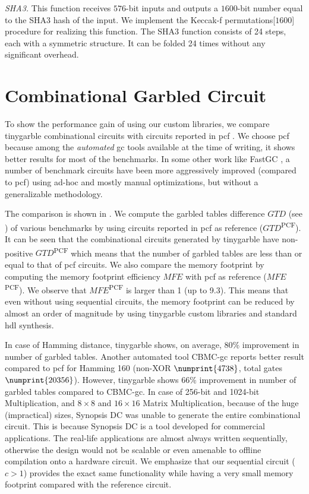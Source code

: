 \textit{SHA3.} This function receives $576$-bit inputs and outputs a $1600$-bit number equal to the SHA3 hash of the input.
We implement the Keccak-f permutations[$1600$] procedure for realizing this function.
The SHA3 function consists of 24 steps, each with a symmetric structure.
It can be folded 24 times without any significant overhead.

\section{Combinational Garbled Circuit}
To show the performance gain of using our custom libraries, we compare \gls{tinygarble} combinational circuits with circuits reported in \gls{pcf} \cite{kreuter2013pcf}.
We choose \gls{pcf} because among the \emph{automated} \acrshort{gc} tools available at the time of writing, it shows better results for most of the benchmarks.
In some other work like FastGC \cite{huang2011faster}, a number of benchmark circuits have been more aggressively improved (compared to \gls{pcf}) using ad-hoc and mostly manual optimizations, but without a generalizable methodology.

The comparison is shown in .
We compute the garbled tables difference $\mathit{GTD}$ (see ) of various benchmarks by using circuits reported in \gls{pcf} as reference ($\mathit{GTD}$\textsuperscript{PCF}).
It can be seen that the combinational circuits generated by \gls{tinygarble} have non-positive $\mathit{GTD}$\textsuperscript{PCF} which means that the number of garbled tables are less than or equal to that of \gls{pcf} circuits.
We also compare the memory footprint by computing the memory footprint efficiency $\mathit{MFE}$ with \gls{pcf} as reference ($\mathit{MFE}$\textsuperscript{PCF}).
We observe that $\mathit{MFE}$\textsuperscript{PCF} is larger than 1 (up to 9.3).
This means that even without using sequential circuits, the memory footprint can be reduced by almost an order of magnitude by using \gls{tinygarble} custom libraries and standard \acrshort{hdl} synthesis.

In case of Hamming distance, \gls{tinygarble} shows, on average, $80\%$ improvement in number of garbled tables.
Another automated tool CBMC-\acrshort{gc} \cite{franz2014cbmc} reports better result compared to \gls{pcf} for Hamming 160 (non-XOR $\numprint{4738}$, total gates $\numprint{20356}$).
However, \gls{tinygarble} shows $66\%$ improvement in number of garbled tables compared to CBMC-\acrshort{gc}.
In case of 256-bit and 1024-bit Multiplication, and $8\times 8$ and $16\times 16$ Matrix Multiplication, because of the huge (impractical) sizes, Synopsis DC was unable to generate the entire combinational circuit.
This is because Synopsis DC is a tool developed for commercial applications.
The real-life applications are almost always written sequentially, otherwise the design would not be scalable or even amenable to offline compilation onto a hardware circuit.
We emphasize that our sequential circuit ($c>1$) provides the exact same functionality while having a very small memory footprint compared with the reference circuit.

